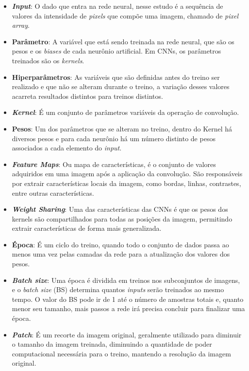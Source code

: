 \begin{itemize}
    \item \textbf{\textit{Input}}: O dado que entra na rede neural, nesse estudo é a sequência de valores da intensidade de \textit{pixels} que compõe uma imagem, chamado de \textit{pixel array}.
    \item \textbf{Parâmetro}: A variável que está sendo treinada na rede neural, que são os pesos e os \textit{biases} de cada neurônio artificial. Em CNNs, os parâmetros treinados são os \textit{kernels}.
    \item \textbf{Hiperparâmetros}: As variáveis que são definidas antes do treino ser realizado e que não se alteram durante o treino, a variação desses valores acarreta resultados distintos para treinos distintos.
    \item \textbf{\textit{Kernel}}: É um conjunto de parâmetros variáveis da operação de convolução.
    \item \textbf{Pesos}: Um dos parâmetros que se alteram no treino, dentro do Kernel há diversos pesos e para cada neurônio há um número distinto de pesos associados a cada elemento do \textit{input}.
    \item{\textit{\textbf{Feature Maps}}}: Ou mapa de características, é o conjunto de valores adquiridos em uma imagem após a aplicação da convolução. São responsáveis por extrair características locais da imagem, como bordas, linhas, contrastes, entre outras características.
    \item \textbf{\textit{Weight Sharing}}: Uma das características das CNNs é que os pesos dos kernels são compartilhados para todas as posições da imagem, permitindo extrair características de forma mais generalizada.
    \item \textbf{Época}: É um ciclo do treino, quando todo o conjunto de dados passa ao menos uma vez pelas camadas da rede para a atualização dos valores dos pesos. 
    \item \textbf{\textit{Batch size}}: Uma época é dividida em treinos nos subconjuntos de imagens, e o \textit{batch size} (BS) determina quantos \textit{inputs} serão treinados ao mesmo tempo. O valor do BS pode ir de 1 até o número de amostras totais e, quanto menor seu tamanho, mais passos a rede irá precisa concluir para finalizar uma época.
    \item \textbf{\textit{Patch}}: É um recorte da imagem original, geralmente utilizado para diminuir o tamanho da imagem treinada, diminuindo a quantidade de poder computacional necessária para o treino, mantendo a resolução da imagem original.

\end{itemize}
